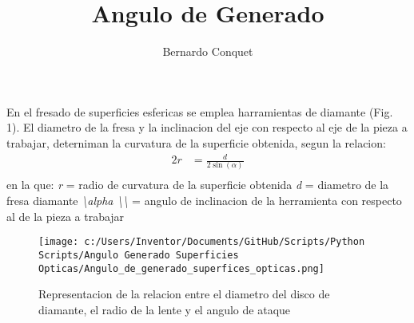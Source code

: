 \documentclass{article}%
\title{Angulo de Generado}%
\author{Bernardo Conquet}%
\begin{document}
%
\normalsize%
\maketitle%
En el fresado de superficies esfericas se emplea harramientas de diamante (Fig. 1). El diametro de la fresa y la inclinacion del eje con respecto al eje de la pieza a trabajar, deterniman la curvatura de la superficie obtenida, segun la relacion:%
\begin{alignat*}{2}%
r &= \frac{d}{2 \sin(\alpha)} \\%
\end{alignat*}%
en la que:\newline%
%
\textit{r }%
= radio de curvatura de la superficie obtenida\newline%
%
\textit{d }%
= diametro de la fresa diamante\newline%
%
\textit{\textbackslash{}alpha \textbackslash{}\textbackslash{}}%
= angulo de inclinacion de la herramienta con respecto al de la pieza a trabajar%


\begin{figure}[h!]%
\centering%
\texttt{[image: c:/Users/Inventor/Documents/GitHub/Scripts/Python Scripts/Angulo Generado Superficies Opticas/Angulo\_de\_generado\_superfices\_opticas.png]}%
\caption{Representacion de la relacion entre el diametro del disco de diamante, el radio de la lente y el angulo de ataque}%
\end{figure}

%
\end{document}
